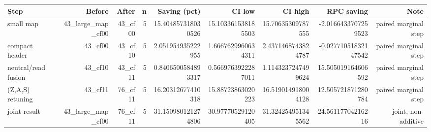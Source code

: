 \begin{tabular}{lrrrrrrrr}
\toprule
Step & Before & After & n & Saving (pct) & CI low & CI high & RPC saving & Note \\
\midrule
small map & 43\_large\_map\_cf00 & 43\_cf00 & 5 & 15.404857318030526 & 15.103361538185503 & 15.70635309787555 & -2.0166433707259523 & paired marginal step \\
compact header & 43\_cf00 & 43\_cf10 & 5 & 2.051954935222955 & 1.6667629960634311 & 2.4371468743824787 & -0.02771051832147542 & paired marginal step \\
neutral/read fusion & 43\_cf10 & 43\_cf11 & 5 & 0.8406500584893317 & 0.5669763922287011 & 1.1143237247499624 & 15.505019164606592 & paired marginal step \\
(Z,A,S) retuning & 43\_cf11 & 76\_cf11 & 5 & 16.20312677410318 & 15.88723863020223 & 16.519014918004128 & 12.505721871280784 & paired marginal step \\
joint result & 43\_large\_map\_cf00 & 76\_cf11 & 5 & 31.150980121274806 & 30.97770529120405 & 31.324254951345562 & 24.56117704216216 & joint, non-additive \\
\bottomrule
\end{tabular}
